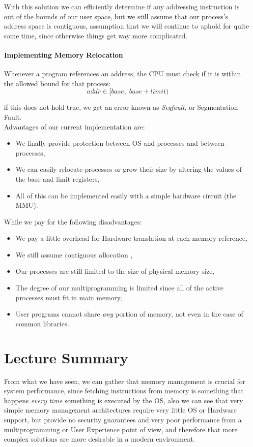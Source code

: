\documentclass[openright, twoside]{report}
\theoremstyle{definition}
\theoremstyle{example}
\begin{document}
		With this solution we can efficiently determine if any addressing instruction is out of the bounds of our user space, but we still 
		assume that our process's address space is contiguous, assumption that we will continue to uphold for quite some time, since otherwise 
		things get way more complicated.

		\paragraph{Implementing Memory Relocation}
		Whenever a program references an address, the CPU must check if it is within the allowed bound for that process:
		\[
			addr \in [base, \; base + limit)	
		\]

		if this does not hold true, we get an error known as \emph{Segfault}, or Segmentation Fault.\\

		Advantages of our current implementation are:
		\begin{itemize}
			\item We finally provide protection between OS and processes and between processes,
			\item We can easily relocate processes or grow their size by altering the values of the base and limit registers,
			\item All of this can be implemented easily with a simple hardware circuit (the MMU).
		\end{itemize}
		While we pay for the following disadvantages:
		\begin{itemize}
			\item We pay a little overhead for Hardware translation at each memory reference,
			\item We still assume contiguous allocation ,
			\item Our processes are still limited to the size of physical memory size,
			\item The degree of our multiprogramming is limited since all of the active processes must fit in main memory, 
			\item User programs cannot share \emph{any} portion of memory, not even in the case of common libraries. 
		\end{itemize}

	\section{Lecture Summary}
	From what we have seen, we can gather that memory management is crucial for system performance, since fetching instructions from 
	memory is something that happens \emph{every time} something is executed by the OS, also we can see that very simple memory management 
	architectures require very little OS or Hardware support, but provide no security guarantees and very poor performance from a 
	multiprogramming or User Experience point of view, and therefore that more complex solutions are more desirable in a modern environment.
\end{document}
